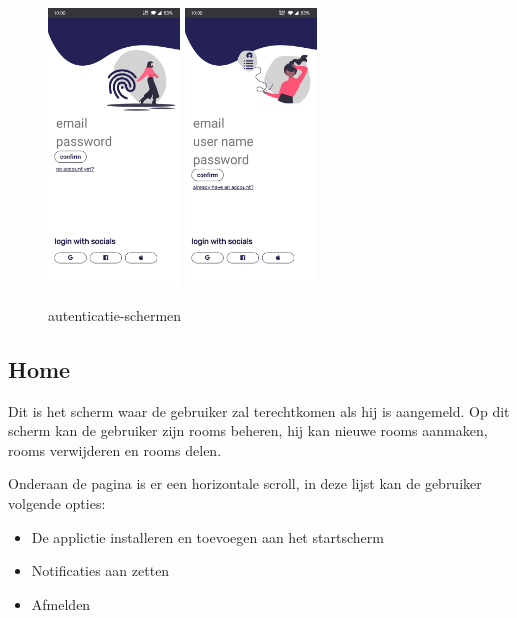 		
		\begin{figure}[H]
			\centering
			\includegraphics[width=35mm]{./img/POC/login.jpg}{}		\includegraphics[width=35mm]{./img/POC/register.jpg}{}
			\caption{autenticatie-schermen}
		\end{figure}
		
	\subsection{Home}
		Dit is het scherm waar de gebruiker zal terechtkomen als hij is aangemeld. 
		Op dit scherm kan de gebruiker zijn rooms beheren, hij kan nieuwe rooms aanmaken, rooms verwijderen en rooms delen.
		
		Onderaan de pagina is er een horizontale scroll, in deze lijst kan de gebruiker volgende opties:
		\begin{itemize}
			\item De applictie installeren en toevoegen aan het startscherm
			\item Notificaties aan zetten 
			\item Afmelden
		\end{itemize}
		
